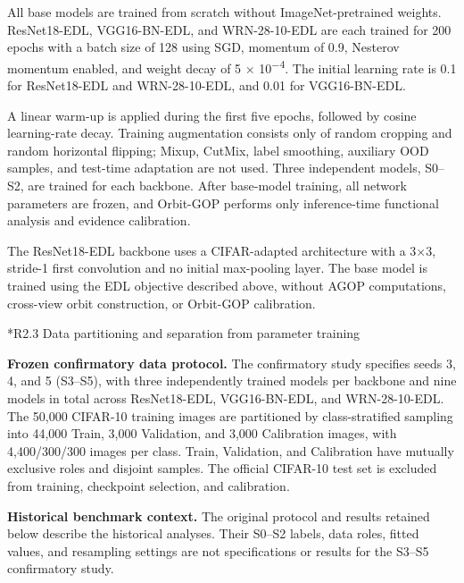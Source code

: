 \documentclass[11pt,a4paper]{article}
\makeatletter
\renewcommand\subsection{\@startsection{subsection}{2}{\z@}{-1.8ex plus -.5ex minus -.2ex}{.7ex plus .2ex}{\normalfont\normalsize\bfseries\raggedright}}
\makeatother
\begin{document}
All base models are trained from scratch without ImageNet-pretrained weights. ResNet18-EDL, VGG16-BN-EDL, and WRN-28-10-EDL are each trained for 200 epochs with a batch size of 128 using SGD, momentum of 0.9, Nesterov momentum enabled, and weight decay of 5 × 10\textsuperscript{−4}. The initial learning rate is 0.1 for ResNet18-EDL and WRN-28-10-EDL, and 0.01 for VGG16-BN-EDL.

A linear warm-up is applied during the first five epochs, followed by cosine learning-rate decay. Training augmentation consists only of random cropping and random horizontal flipping; Mixup, CutMix, label smoothing, auxiliary OOD samples, and test-time adaptation are not used. Three independent models, S0--S2, are trained for each backbone. After base-model training, all network parameters are frozen, and Orbit-GOP performs only inference-time functional analysis and evidence calibration.

The ResNet18-EDL backbone uses a CIFAR-adapted architecture with a 3×3, stride-1 first convolution and no initial max-pooling layer. The base model is trained using the EDL objective described above, without AGOP computations, cross-view orbit construction, or Orbit-GOP calibration.

\subsection*{R2.3 Data partitioning and separation from parameter training}\label{s2.3-data-partitioning-and-separation-from-parameter-training}

\noindent\textbf{Frozen confirmatory data protocol.} The confirmatory study specifies seeds 3, 4, and 5 (S3--S5), with three independently trained models per backbone and nine models in total across ResNet18-EDL, VGG16-BN-EDL, and WRN-28-10-EDL. The 50,000 CIFAR-10 training images are partitioned by class-stratified sampling into 44,000 Train, 3,000 Validation, and 3,000 Calibration images, with 4,400/300/300 images per class. Train, Validation, and Calibration have mutually exclusive roles and disjoint samples. The official CIFAR-10 test set is excluded from training, checkpoint selection, and calibration.

\noindent\textbf{Historical benchmark context.} The original protocol and results retained below describe the historical analyses. Their S0--S2 labels, data roles, fitted values, and resampling settings are not specifications or results for the S3--S5 confirmatory study.
\end{document}

